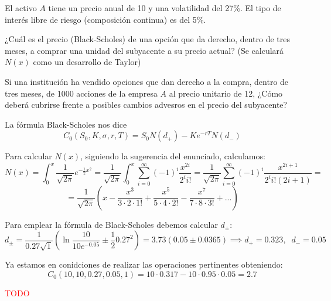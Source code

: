 \begin{problem}[7]
El activo $A$ tiene un precio anual de 10 y una volatilidad del 27\%. El tipo de interés libre de riesgo (composición continua) es del 5\%.

\ppart ¿Cuál es el precio (Black-Scholes) de una opción que da derecho, dentro de tres meses, a comprar una unidad del subyacente a su precio actual? (Se calculará $N(x)$ como un desarrollo de Taylor)

\ppart Si una institución ha vendido opciones que dan derecho a la compra, dentro de tres meses, de 1000 acciones de la empresa $A$ al precio unitario de 12, ¿Cómo deberá cubrirse frente a posibles cambios advesros en el precio del subyacente?
\solution
{}

\spart

La fórmula Black-Scholes nos dice
\[C_0(S_0,K,σ,r,T) = S_0N(d_+)-Ke^{-rT}N(d_-)\]

Para calcular $N(x)$, siguiendo la sugerencia del enunciado, calculamos:
\[N(x) = \int_{0}^{x}\frac{1}{\sqrt{2π}}e^{-\frac{1}{2}x^2} = \frac{1}{\sqrt{2π}}\int_0^x\sum_{i=0}^{\infty}(-1)^i\frac{x^{2i}}{2^ii!} = \frac{1}{\sqrt{2π}}\sum_{i=0}^{\infty}(-1)^i\frac{x^{2i+1}}{2^ii!(2i+1)} =\]
\[=\frac{1}{\sqrt{2π}}\left(x-\frac{x^3}{3 \cdot 2 \cdot 1!} +\frac{x^5}{5 \cdot 4 \cdot 2!} - \frac{x^7}{7\cdot 8 \cdot 3!}+...\right)\]

Para emplear la fórmula de Black-Scholes debemos calcular $d_{\pm}$:
\[d_{\pm} = \frac{1}{0.27\sqrt{1}}\left(\ln \frac{10}{10e^{-0.05}}\pm\frac{1}{2}0.27^2 \right)=3.73 \left(0.05 \pm 0.0365\right) \implies d_+ = 0.323, \;\; d_-=0.05 \]

Ya estamos en conidciones de realizar las operaciones pertinentes obteniendo:
\[C_0(10,10,0.27,0.05,1) = 10 \cdot 0.317 - 10\cdot 0.95 \cdot 0.05 = 2.7\]

\spart

\textcolor{red}{TODO}
\end{problem}

